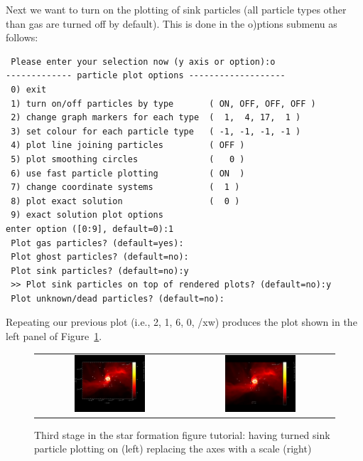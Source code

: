 \documentclass[a4paper,10pt]{article}
\begin{document}
 Next we want to turn on the plotting of sink particles (all particle types other than gas are turned off by default). This is done in the o)ptions submenu as follows:
\begin{verbatim}
 Please enter your selection now (y axis or option):o
------------- particle plot options -------------------
 0) exit 
 1) turn on/off particles by type       ( ON, OFF, OFF, OFF )
 2) change graph markers for each type  (  1,  4, 17,  1 )
 3) set colour for each particle type   ( -1, -1, -1, -1 )
 4) plot line joining particles         ( OFF ) 
 5) plot smoothing circles              (   0 ) 
 6) use fast particle plotting          ( ON  ) 
 7) change coordinate systems           (  1 ) 
 8) plot exact solution                 (  0 ) 
 9) exact solution plot options 
enter option ([0:9], default=0):1
 Plot gas particles? (default=yes):
 Plot ghost particles? (default=no):
 Plot sink particles? (default=no):y
 >> Plot sink particles on top of rendered plots? (default=no):y
 Plot unknown/dead particles? (default=no):
\end{verbatim}
 Repeating our previous plot (i.e., 2, 1, 6, 0, /xw) produces the plot shown in the left panel of Figure~\ref{fig:starpart3}. 
 \begin{figure}[h]
\begin{center}
\begin{tabular}{cc}
\includegraphics[width=0.5\textwidth]{starpart5.png} &
\includegraphics[width=0.5\textwidth]{starpart6.png}
\end{tabular}
\caption{Third stage in the star formation figure tutorial: having turned sink particle plotting on (left) replacing the axes with a scale (right)}
\label{fig:starpart3}
\end{center}
\end{figure}
\end{document}
